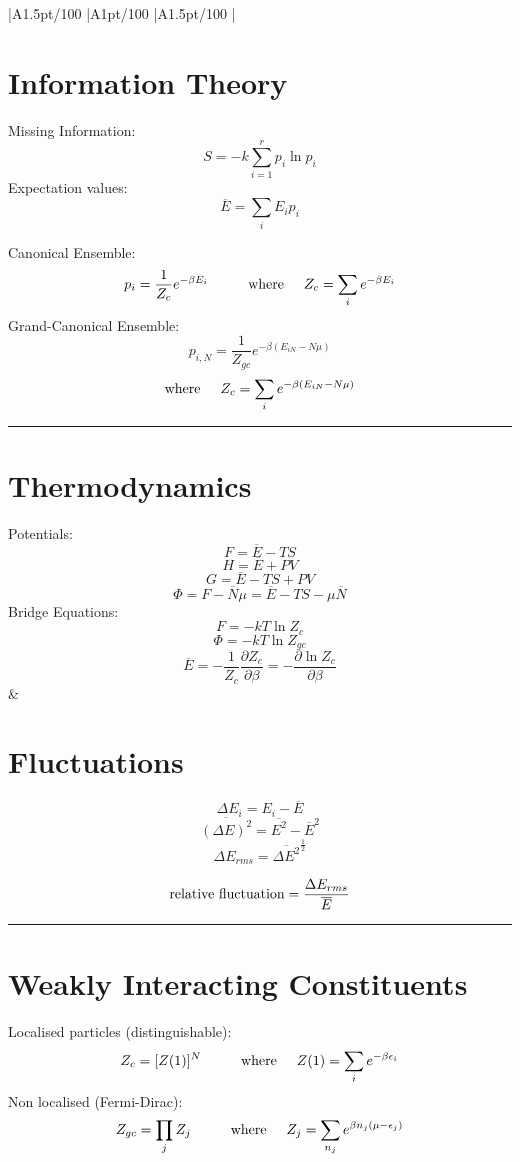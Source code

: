 \documentclass[table,cmyk]{article}
\makeatletter
\newcommand\ratio[2]{\strip@pt\dimexpr#1pt/#2\relax}
\makeatother
\begin{document}
\begin{longtable}
{
    |A{1.5}{\ratio{30}{100}}%
    |A{1}{\ratio{30}{100}}%
    |A{1.5}{\ratio{30}{100}}%
    |%
}\hline
\section*{Information Theory}
Missing Information:
\[
S = -k\sum_{i=1}^{r} p_{i} \ln{p_{i}}
\]
Expectation values:
\[
\overline{E} = \sum_{i}E_{i}p_{i}
\]

Canonical Ensemble:
\[
p_{i} = \frac{1}{Z_{c}}e^{-\beta{}E_{i}} \textmd{\hspace{1cm}where\hspace{0.5cm}} Z_{c} = \sum_{i}e^{-\beta{}E_{i}} \]
Grand-Canonical Ensemble:
\[
p_{i,N} = \frac{1}{Z_{gc}}e^{-\beta{}(E_{iN}-N\mu)} \]\[ \textmd{where\hspace{0.5cm}}Z_{c} = \sum_{i}e^{-\beta{}(E_{iN}-N\mu)}
\]
\noindent\rule{7.8cm}{0.4pt}
\section*{Thermodynamics}
Potentials:
\[F = \overline{E} - TS\]
\[H = \overline{E} + PV\]
\[G = \overline{E} - TS + PV\]
\[\Phi{}= F - \overline{N}\mu = \overline{E} - TS - \mu \overline{N}\]
Bridge Equations:
\[F = -kT\ln{Z_{c}}\]
\[\Phi = -kT \ln{Z_{gc}}\]
\[\overline{E} = -\frac{1}{Z_{c}}\frac{\partial Z_{c}}{\partial \beta} = - \frac{\partial{\ln{Z_{c}}}}{\partial{\beta}}\]
&
\section*{Fluctuations}
\[\Delta E_{i} = E_{i} - \overline{E}\]
\[\overline{(\Delta E)^2} = \overline{E^2} - \overline{E}^2\]
\[\Delta E_{rms} = \overline{\Delta E^2}^\frac{1}{2}\]

\[\textmd{relative fluctuation} = \frac{\Delta E_{rms}}{\overline{E}}\]

\noindent\rule{7.8cm}{0.4pt}
\section*{Weakly Interacting \newline  Constituents}
Localised particles (distinguishable):
\[Z_{c} = [Z(1)]^N \textmd{\hspace{1cm}where\hspace{0.5cm}}
Z(1) = \sum_{i}e^{-\beta \epsilon_{i}}\]
Non localised (Fermi-Dirac):
\[Z_{gc} = \prod_j Z_{j} \textmd{\hspace{1cm}where\hspace{0.5cm}} Z_{j} = \sum_{n_{j}}e^{\beta n_{j}(\mu - \epsilon_{j})}\]


\end{longtable}
\end{document}
